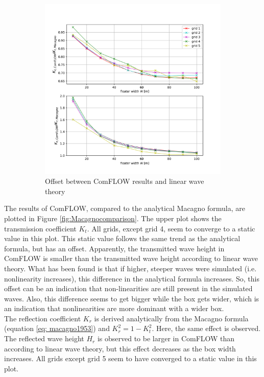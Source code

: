 \begin{figure}[h]
\begin{subfigure}[b]{0.49\textwidth}
        \includegraphics[width=\textwidth]{figures/Validation/magagno_offset_eps.png}
        \caption[]%
        {{\small Offset between ComFLOW results and linear wave theory}}    
        \label{fig:offset macagno}
    \end{subfigure}
    
    \caption{}
    \label{fig: }
\end{figure}

The results of ComFLOW, compared to the analytical Macagno formula, are plotted in Figure \ref{fig:Macagnocomparison}. 
The upper plot shows the transmission coefficient $K_t$. All grids, except grid 4, seem to converge to a static value in this plot. This static value follows the same trend as the analytical formula, but has an offset. Apparently, the transmitted wave height in ComFLOW is smaller than the transmitted wave height according to linear wave theory. What has been found is that if higher, steeper waves were simulated (i.e. nonlinearity increases), this difference in the analytical formula increases. So, this offset can be an indication that non-linearities are still present in the simulated waves. Also, this difference seems to get bigger while the box gets wider, which is an indication that nonlinearities are more dominant with a wider box.\\

The reflection coefficient $K_r$ is derived analytically from the Macagno formula (equation \ref{eq: macagno1953}) and $K_r^2 = 1 - K_t^2$. Here, the same effect is observed. The reflected wave height $H_r$ is observed to be larger in ComFLOW than according to linear wave theory, but this effect decreases as the box width increases. All grids except grid 5 seem to have converged to a static value in this plot.\\

